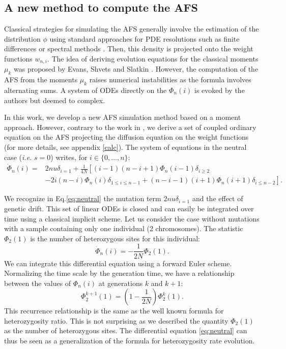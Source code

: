 \subsection{A new method to compute the AFS}
Classical strategies for simulating the AFS generally involve the estimation of the distribution $\phi$ using standard approaches for PDE resolutions such as finite differences \cite{gutenkunst2009} or spectral methods \cite{lukic2011}. Then, this density is projected onto the weight functions $w_{n,i}$.
The idea of deriving evolution equations for the classical moments $\mu_k$ was proposed by Evans, Shvets and Slatkin \cite{evans2007}. However, the computation of the AFS from the moments $\mu_k$ raises numerical instabilities as the formula involves alternating sums. A system of ODEs directly on the $\Phi_n(i)$ is evoked by the authors but deemed to complex.

In this work, we develop a new AFS simulation method based on a moment approach. However, contrary to the work in \cite{evans2007}, we derive a set of coupled ordinary equation on the AFS projecting the diffusion equation on the weight functions (for more details, see appendix \ref{calc}). The system of equations in the neutral case (\textit{i.e.} $s = 0$) writes, for $i \in \{0,... , n\}$:
\begin{equation}
\begin{split}
\dot \Phi_n(i)=& 2nu  \delta_{i=1} + \frac{1}{4 N} \left[ (i-1)(n-i+1) \Phi_n(i-1)\delta_{i\geq 2} \right.\\
		      & \left.-2i(n-i)\Phi_n(i)\delta_{1\leq i\leq n-1}  + (n-i-1)(i+1)\Phi_n(i+1)\delta_{i\leq n-2} \right].
\end{split}
\label{eq:neutral}
\end{equation}

We recognize in Eq.\eqref{eq:neutral} the mutation term $2nu  \delta_{i=1}$ and the effect of genetic drift. This set of linear ODEs is closed and can easily be integrated over time using a classical implicit scheme.
Let us consider the case without mutations with a sample containing only one individual (2 chromosomes). The statistic $\Phi_2(1)$ is the number of heterozygous sites for this individual: 
$$
	\dot \Phi_n(i)= -\frac{1}{2 N} \Phi_2(1).
$$
We can integrate this differential equation using a forward Euler scheme. Normalizing the time scale by the generation time, we have a relationship between the values of $\Phi_n(i)$ at generations $k$ and $k+1$:
$$
	\Phi_2^{k+1}(1) = (1-\frac{1}{2 N})\Phi_2^k(1).
$$
This recurrence relationship is the same as the well known formula for heterozygosity ratio. This is not surprising as we described the quantity $\Phi_2(1)$ as the number of heterozygous sites. The differential equation \eqref{eq:neutral} can thus be seen as a generalization of the formula for heterozygosity rate evolution.

